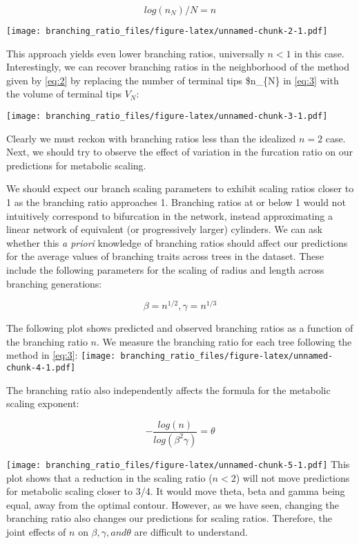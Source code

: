 \documentclass[]{article}
\begin{document}
\begin{equation} \label{eq:3}  
log(n_{N}) / N = n
\end{equation}

\texttt{[image: branching\_ratio\_files/figure-latex/unnamed-chunk-2-1.pdf]}

This approach yields even lower branching ratios, universally \(n < 1\)
in this case. Interestingly, we can recover branching ratios in the
neighborhood of the method given by \ref{eq:2} by replacing the number
of terminal tips \$n\_\{N\} in \ref{eq:3} with the volume of terminal
tips \(V_{N}\):

\texttt{[image: branching\_ratio\_files/figure-latex/unnamed-chunk-3-1.pdf]}

Clearly we must reckon with branching ratios less than the idealized
\(n = 2\) case. Next, we should try to observe the effect of variation
in the furcation ratio on our predictions for metabolic scaling.

We should expect our branch scaling parameters to exhibit scaling ratios
closer to 1 as the branching ratio approaches 1. Branching ratios at or
below 1 would not intuitively correspond to bifurcation in the network,
instead approximating a linear network of equivalent (or progressively
larger) cylinders. We can ask whether this \emph{a priori} knowledge of
branching ratios should affect our predictions for the average values of
branching traits across trees in the dataset. These include the
following parameters for the scaling of radius and length across
branching generations:

\[\beta = n^{1/2},      \gamma = n^{1/3}\]

The following plot shows predicted and observed branching ratios as a
function of the branching ratio \(n\). We measure the branching ratio
for each tree following the method in \ref{eq:3}:
\texttt{[image: branching\_ratio\_files/figure-latex/unnamed-chunk-4-1.pdf]}

The branching ratio also independently affects the formula for the
metabolic scaling exponent:

\begin{equation} \label{eq:4}  
-\frac{log(n)}{log(\beta^{2}\gamma)} = \theta
\end{equation}

\texttt{[image: branching\_ratio\_files/figure-latex/unnamed-chunk-5-1.pdf]}
This plot shows that a reduction in the scaling ratio (\(n < 2\)) will
not move predictions for metabolic scaling closer to 3/4. It would move
theta, beta and gamma being equal, away from the optimal contour.
However, as we have seen, changing the branching ratio also changes our
predictions for scaling ratios. Therefore, the joint effects of \(n\) on
\(\beta, \gamma, and \theta\) are difficult to understand.
\end{document}
